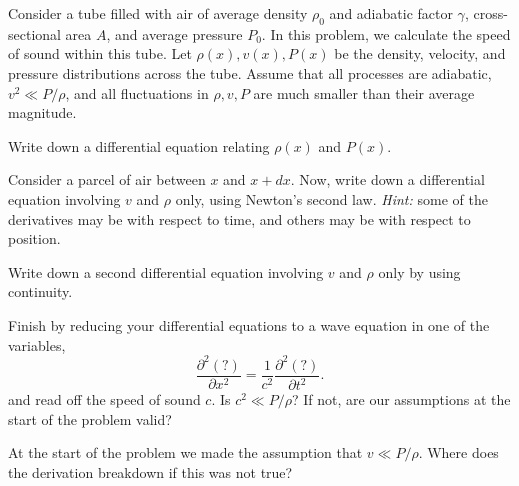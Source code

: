 \documentclass[11pt]{scrartcl}
\begin{document}
\begin{prob}
    Consider a tube filled with air of average density $\rho_0$ and adiabatic factor $\gamma$, cross-sectional area $A$, and average pressure $P_0$. In this problem, we calculate the speed of sound within this tube. Let $\rho(x), v(x), P(x)$ be the density, velocity, and pressure distributions across the tube. Assume that all processes are adiabatic, $v^2 \ll P/\rho$, and all fluctuations in $\rho,v,P$ are much smaller than their average magnitude.
    \begin{anum}
        \item Write down a differential equation relating $\rho(x)$ and $P(x)$.
        \item Consider a parcel of air between $x$ and $x+dx$. Now, write down a differential equation involving $v$ and $\rho$ only, using Newton's second law. \textit{Hint:} some of the derivatives may be with respect to time, and others may be with respect to position.
        \item Write down a second differential equation involving $v$ and $\rho$ only by using continuity.
        \item Finish by reducing your differential equations to a wave equation in one of the variables,
        $$\frac{\partial^2 (?)}{\partial x^2} = \frac 1{c^2} \frac{\partial^2 (?)}{\partial t^2}.$$
        and read off the speed of sound $c$. Is $c^2 \ll P/\rho$? If not, are our assumptions at the start of the problem valid?
        \item At the start of the problem we made the assumption that $v \ll P/ \rho$. Where does the derivation breakdown if this was not true?
    \end{anum}
\end{prob}
\end{document}
